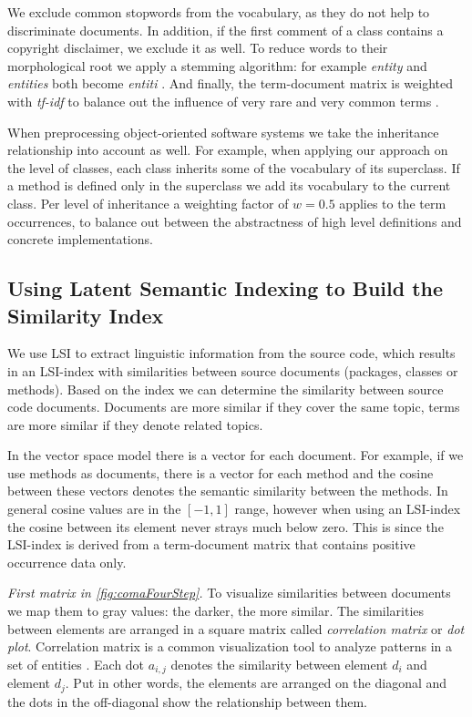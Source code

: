 We exclude common stopwords from the vocabulary, as they do not help to discriminate documents. In addition, if the first comment of a class contains a copyright disclaimer, we exclude it as well. To reduce words to their morphological root we apply a stemming algorithm: for example \emph{entity} and \emph{entities} both become \emph{entiti} \cite{Port80a}. And finally, the term-document matrix is weighted with \emph{tf-idf} to balance out the influence of very rare and very common terms \cite{Duma91a}.

When preprocessing object-oriented software systems we take the inheritance relationship into account as well. For example, when applying our approach on the level of classes, each class inherits some of the vocabulary of its superclass. If a method is defined only in the superclass we add its vocabulary to the current class. Per level of inheritance a weighting factor of $w = 0.5$ applies to the term occurrences, to balance out between the abstractness of high level definitions and concrete implementations.

\subsection{Using Latent Semantic Indexing to Build the Similarity Index}
\label{sec:lsi}

We use LSI to extract linguistic information from the source code, which results in an LSI-index with similarities between source documents (\ie packages, classes or methods). Based on the index we can determine the similarity between source code documents. Documents are more similar if they cover the same topic, terms are more similar if they denote related topics.

In the vector space model there is a vector for each document. For example, if we use methods as documents, there is a vector for each method and the cosine between these vectors denotes the semantic similarity between the methods. In general cosine values are in the $[-1,1]$ range, however when using an LSI-index the cosine between its element never strays much below zero. This is since the LSI-index is derived from a term-document matrix that contains positive occurrence data only.

\emph{First matrix in \autoref{fig:comaFourStep}.} To visualize similarities between documents we map them to gray values: the darker, the more similar. The similarities between elements are arranged in a square matrix called \emph{correlation matrix} or \emph{dot plot}. Correlation matrix is a common visualization tool to analyze patterns in a set of entities \cite{Ling73a}. Each dot $a_{i,j}$ denotes the similarity between element $d_i$ and element $d_j$. Put in other words, the elements are arranged on the diagonal and the dots in the off-diagonal show the relationship between them.

